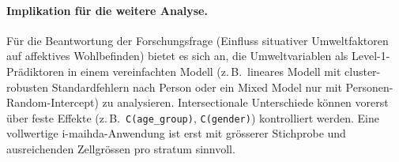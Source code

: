 \paragraph{Implikation für die weitere Analyse.}
Für die Beantwortung der Forschungsfrage (Einfluss situativer Umweltfaktoren auf affektives Wohlbefinden) bietet es sich an, die Umweltvariablen als Level-1-Prädiktoren in einem vereinfachten Modell (z.\,B.\ lineares Modell mit cluster-robusten Standardfehlern nach Person oder ein Mixed Model nur mit Personen-Random-Intercept) zu analysieren. Intersectionale Unterschiede können vorerst über feste Effekte (z.\,B.\ \texttt{C(age\_group)}, \texttt{C(gender)}) kontrolliert werden. Eine vollwertige \gls{i-maihda}-Anwendung ist erst mit grösserer Stichprobe und ausreichenden Zellgrössen pro \gls{stratum} sinnvoll.



